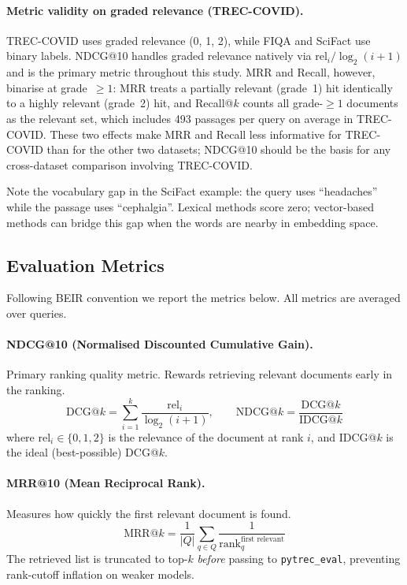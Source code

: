 \documentclass[12pt, a4paper]{article}
\newcommand{\tc}{TREC-COVID}
\newcommand{\fiqa}{FIQA}
\newcommand{\scifact}{SciFact}
\begin{document}
\paragraph{Metric validity on graded relevance (\tc{}).}
\tc{} uses graded relevance (0, 1, 2), while \fiqa{} and \scifact{} use
binary labels.  NDCG@10 handles graded relevance natively via
$\text{rel}_i / \log_2(i+1)$ and is the primary metric throughout this
study.  MRR and Recall, however, binarise at grade~$\geq 1$: MRR treats
a partially relevant (grade~1) hit identically to a highly relevant
(grade~2) hit, and Recall@$k$ counts all grade-$\geq 1$ documents as the
relevant set, which includes 493 passages per query on average in \tc{}.
These two effects make MRR and Recall less informative for \tc{} than
for the other two datasets; NDCG@10 should be the basis for any
cross-dataset comparison involving \tc{}.

Note the vocabulary gap in the \scifact{} example: the query uses ``headaches''
while the passage uses ``cephalgia''.  Lexical methods score zero; vector-based
methods can bridge this gap when the words are nearby in embedding space.

\subsection{Evaluation Metrics}
\label{sec:metrics}

Following BEIR convention we report the metrics below.  All metrics are
averaged over queries.

\paragraph{NDCG@10 (Normalised Discounted Cumulative Gain).}
Primary ranking quality metric.  Rewards retrieving relevant documents early
in the ranking.
\begin{equation}
  \text{DCG@}k = \sum_{i=1}^{k} \frac{\text{rel}_i}{\log_2(i+1)}, \qquad
  \text{NDCG@}k = \frac{\text{DCG@}k}{\text{IDCG@}k}
  \label{eq:ndcg}
\end{equation}
where $\text{rel}_i \in \{0,1,2\}$ is the relevance of the document at rank
$i$, and IDCG@$k$ is the ideal (best-possible) DCG@$k$.

\paragraph{MRR@10 (Mean Reciprocal Rank).}
Measures how quickly the first relevant document is found.
\begin{equation}
  \text{MRR@}k = \frac{1}{|Q|} \sum_{q \in Q}
    \frac{1}{\text{rank}_{q}^{\text{first relevant}}}
  \label{eq:mrr}
\end{equation}
The retrieved list is truncated to top-$k$ \emph{before} passing to
\texttt{pytrec\_eval}, preventing rank-cutoff inflation on weaker models.
\end{document}
